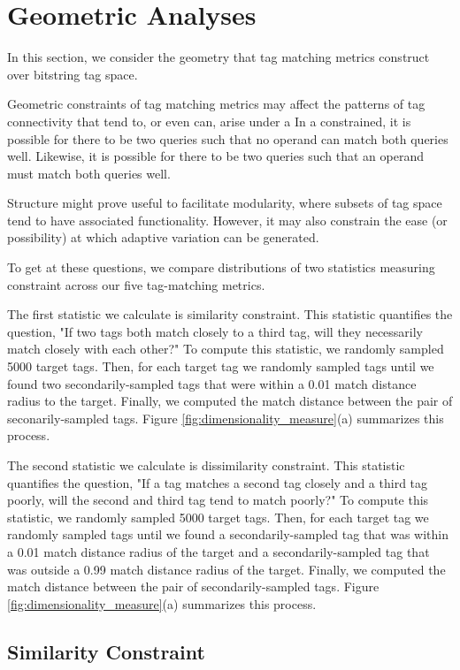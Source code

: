 \section{Geometric Analyses} \label{sec:geometric}

In this section, we consider the geometry that tag matching metrics construct over bitstring tag space.


Geometric constraints of tag matching metrics may affect the patterns of tag connectivity that tend to, or even can, arise under a
In a constrained, it is possible for there to be two queries such that no operand can match both queries well.
Likewise, it is possible for there to be two queries such that an operand must match both queries well.

Structure might prove useful to facilitate modularity, where subsets of tag space tend to have associated functionality.
However, it may also constrain the ease (or possibility) at which adaptive variation can be generated.

To get at these questions, we compare distributions of two statistics measuring constraint across our five tag-matching metrics.


The first statistic we calculate is similarity constraint.
This statistic quantifies the question, "If two tags both match closely to a third tag, will they necessarily match closely with each other?"
To compute this statistic, we randomly sampled 5000 target tags.
Then, for each target tag we randomly sampled tags until we found two secondarily-sampled tags that were within a 0.01 match distance radius to the target.
Finally, we computed the match distance between the pair of seconarily-sampled tags.
Figure \ref{fig:dimensionality_measure}(a) summarizes this process.

The second statistic we calculate is dissimilarity constraint.
This statistic quantifies the question, "If a tag matches a second tag closely and a third tag poorly, will the second and third tag tend to match poorly?"
To compute this statistic, we randomly sampled 5000 target tags.
Then, for each target tag we randomly sampled tags until we found a secondarily-sampled tag that was within a 0.01 match distance radius of the target and a secondarily-sampled tag that was outside a 0.99 match distance radius of the target.
Finally, we computed the match distance between the pair of secondarily-sampled tags.
Figure \ref{fig:dimensionality_measure}(a) summarizes this process.

\subsection{Similarity Constraint}


